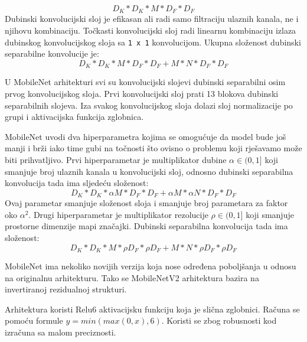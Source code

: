 \documentclass[times, utf8, diplomski,  numeric]{fer}
\begin{document}
\begin{equation}
D_K * D_K * M *  D_F * D_F
\end{equation} Dubinski konvolucijski sloj je efikasan ali radi samo filtraciju ulaznih kanala, ne i njihovu kombinaciju. Točkasti konvolucijski sloj radi linearnu kombinaciju izlaza dubinskog konvolucijskog sloja sa \verb|1 x 1| konvolucijom. Ukupna složenost dubinski separabilne konvolucije je:
\begin{equation}
D_K * D_K * M *  D_F * D_F + M * N * D_F * D_F
\end{equation}
\par
U MobileNet arhitekturi svi su konvolucijski slojevi dubinski separabilni osim prvog konvolucijskog sloja. Prvi konvolucijski sloj prati 13 blokova dubinski separabilnih slojeva. Iza svakog konvolucijskog sloja dolazi sloj normalizacije po grupi i aktivacijska funkcija zglobnica.
\par
MobileNet uvodi dva hiperparametra kojima se omogućuje da model bude još manji i brži iako time gubi na točnosti što ovisno o problemu koji rješavamo može biti prihvatljivo. Prvi hiperparametar je multiplikator dubine $\alpha \in (0,1]$ koji smanjuje broj ulaznih kanala u konvolucijski  sloj, odnosno dubinski separabilna konvolucija tada ima sljedeću složenost:
\begin{equation}
D_K * D_K * \alpha M *  D_F * D_F + \alpha M * \alpha N * D_F * D_F
\end{equation} 
Ovaj parametar smanjuje složenost sloja i smanjuje broj parametara za faktor oko $\alpha^2$. Drugi hiperparametar je multiplikator rezolucije $\rho \in (0,1]$ koji smanjuje prostorne dimenzije mapi značajki. Dubinski separabilna konvolucija tada ima složenost:
\begin{equation}
D_K * D_K *  M *  \rho D_F * \rho D_F +  M *  N * \rho D_F * \rho D_F
\end{equation}  
\par
MobileNet ima nekoliko novijih verzija koja nose određena poboljšanja u odnosu na originalnu arhitekturu. Tako se MobileNetV2 arhitektura bazira na invertiranoj rezidualnoj strukturi. 
\par
Arhitektura koristi Relu6 aktivacijsku funkciju koja je slična zglobnici. Računa se pomoću formule $y = min(max(0,x),6)$. Koristi se zbog robusnosti kod izračuna sa malom preciznosti.
\end{document}
